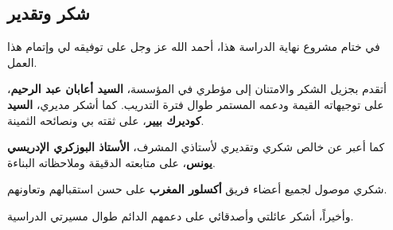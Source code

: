 \begin{Arabic}
\chapter*{شكر وتقدير}

\vspace{0.5cm}

في ختام مشروع نهاية الدراسة هذا، أحمد الله عز وجل على توفيقه لي وإتمام هذا العمل.

أتقدم بجزيل الشكر والامتنان إلى مؤطري في المؤسسة، \textbf{السيد أعابان عبد الرحيم}، على توجيهاته القيمة ودعمه المستمر طوال فترة التدريب. كما أشكر مديري، \textbf{السيد كوديرك بيير}، على ثقته بي ونصائحه الثمينة.

كما أعبر عن خالص شكري وتقديري لأستاذي المشرف، \textbf{الأستاذ البوزكري الإدريسي يونس}، على متابعته الدقيقة وملاحظاته البناءة.

شكري موصول لجميع أعضاء فريق \textbf{أكسلور المغرب} على حسن استقبالهم وتعاونهم.

وأخيراً، أشكر عائلتي وأصدقائي على دعمهم الدائم طوال مسيرتي الدراسية.

\end{Arabic}
